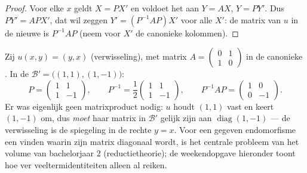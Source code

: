 \begin{proof}
Voor elke $x$ geldt $X = PX'$ en voldoet het  aan $Y = AX$, $Y
= PY'$. Dus $PY' = APX'$, dat wil zeggen $Y' = (P^{-1}AP)X'$ voor
alle $X'$: de matrix van $u$ in de nieuwe  is $P^{-1}AP$ (neem
voor $X'$ de canonieke kolommen).
\end{proof}

\begin{example}
\label{ex:b1:matrices:conjugationrun}
Zij $u(x, y) = (y, x)$ (verwisseling), met matrix $A =
\begin{pmatrix} 0 & 1\\ 1 & 0\end{pmatrix}$ in de canonieke .
In de  $\mathcal B' = \bigl((1,1), (1,-1)\bigr)$:
\[
P = \begin{pmatrix} 1 & 1\\ 1 & -1 \end{pmatrix},
\qquad
P^{-1} = \frac12\begin{pmatrix} 1 & 1\\ 1 & -1 \end{pmatrix},
\qquad
P^{-1} A P = \begin{pmatrix} 1 & 0\\ 0 & -1 \end{pmatrix}.
\]
Er was eigenlijk geen matrixproduct nodig: $u$ houdt $(1,1)$ vast
en keert $(1,-1)$ om, dus \emph{moet} haar matrix in $\mathcal B'$
gelijk zijn aan $\operatorname{diag}(1, -1)$ --- de verwisseling is
de spiegeling in de rechte $y = x$. Voor een gegeven endomorfisme
een  vinden waarin zijn matrix diagonaal wordt, is het
centrale probleem van het volume van bachelorjaar 2
(reductietheorie); de weekendopgave hieronder toont hoe ver
veeltermidentiteiten alleen al reiken.
\end{example}

